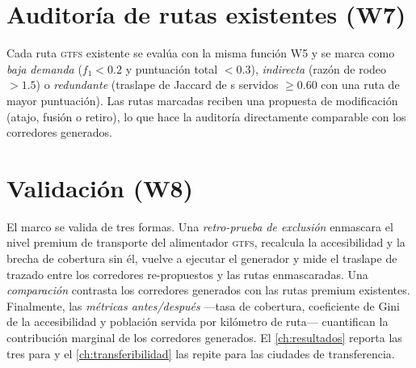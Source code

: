 \section{Auditoría de rutas existentes (W7)}
\label{sec:w7}

Cada ruta \textsc{gtfs} existente se evalúa con la misma función W5 y se marca como
\emph{baja demanda} ($f_1<\num{0.2}$ y puntuación total $<\num{0.3}$),
\emph{indirecta} (razón de rodeo $>\num{1.5}$) o \emph{redundante} (traslape de
Jaccard de \ageb{}s servidos $\ge\num{0.60}$ con una ruta de mayor puntuación). Las
rutas marcadas reciben una propuesta de modificación (atajo, fusión o retiro), lo
que hace la auditoría directamente comparable con los corredores generados.

\section{Validación (W8)}
\label{sec:w8}

El marco se valida de tres formas. Una \emph{retro-prueba de exclusión} enmascara el
nivel premium de transporte del alimentador \textsc{gtfs}, recalcula la accesibilidad
y la brecha de cobertura sin él, vuelve a ejecutar el generador y mide el traslape de
trazado entre los corredores re-propuestos y las rutas enmascaradas. Una
\emph{comparación} contrasta los corredores generados con las rutas premium
existentes. Finalmente, las \emph{métricas antes/después} ---tasa de cobertura,
coeficiente de Gini de la accesibilidad y población servida por kilómetro de ruta---
cuantifican la contribución marginal de los corredores generados. El
\cref{ch:resultados} reporta las tres para \zmg y el \cref{ch:transferibilidad} las
repite para las ciudades de transferencia.
